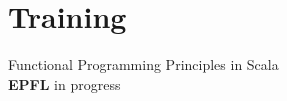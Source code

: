 \documentclass[../cv.tex]{subfiles}
\begin{document}
\hspace{0.2cm}
\begin{minipage}[t]{0.375\linewidth}
	\section{Training}
	Functional Programming Principles in Scala\\
	\textbf{EPFL} \hfill in progress
\end{minipage}
\end{document}

